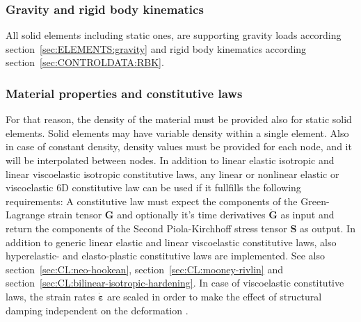 \subsubsection{Gravity and rigid body kinematics}
All solid elements including static ones, are supporting gravity loads according section~\ref{sec:ELEMENTS:gravity}
and rigid body kinematics according section~\ref{sec:CONTROLDATA:RBK}.
\subsubsection{Material properties and constitutive laws}
For that reason, the density of the material must be provided also for static solid elements.
Solid elements may have variable density within a single element.
Also in case of constant density, density values must be provided for each node, and it will be interpolated between nodes.
In addition to linear elastic isotropic and linear viscoelastic isotropic constitutive laws,
any linear or nonlinear elastic or viscoelastic 6D constitutive law can be used if it fullfills the following requirements:
A constitutive law must expect the components of the Green-Lagrange strain tensor $\boldsymbol{G}$
and optionally it's time derivatives $\dot{\boldsymbol{G}}$ as input and return the components of the Second Piola-Kirchhoff
stress tensor $\boldsymbol{S}$ as output. In addition to generic linear elastic and linear viscoelastic constitutive laws,
also hyperelastic- and elasto-plastic constitutive laws are implemented.
See also section~\ref{sec:CL:neo-hookean}, section~\ref{sec:CL:mooney-rivlin} and section~\ref{sec:CL:bilinear-isotropic-hardening}.
In case of viscoelastic constitutive laws, the strain rates $\dot{\boldsymbol{\varepsilon}}$ are scaled in order to make
the effect of structural damping independent on the deformation \cite{KUEBLER2005}.

